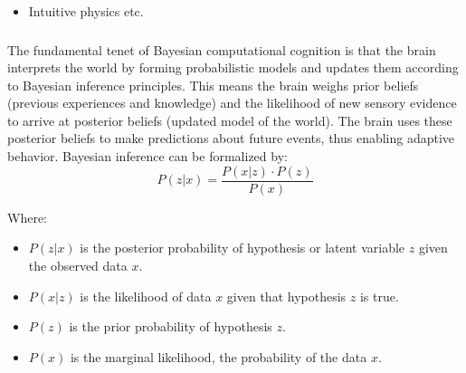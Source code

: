 
\begin{itemize}
    \item Intuitive physics etc.
\end{itemize}

\subsubsection{}

The fundamental tenet of Bayesian computational cognition is that the brain interprets the world by forming probabilistic models and updates them according to Bayesian inference principles. This means the brain weighs prior beliefs (previous experiences and knowledge) and the likelihood of new sensory evidence to arrive at posterior beliefs (updated model of the world). The brain uses these posterior beliefs to make predictions about future events, thus enabling adaptive behavior.
Bayesian inference can be formalized by:
\begin{equation}\label{form:bayes}
    P(z \vert x) = \frac{P(x \vert z) \cdot P(z)}{P(x)}    
\end{equation}

Where:

    

\begin{itemize}
    \item \( P(z \vert x) \) is the posterior probability of hypothesis or latent variable \( z \) given the observed data \( x \).
    \item \( P(x \vert z) \) is the likelihood of data \( x \) given that hypothesis \( z \) is true.
    \item \( P(z) \) is the prior probability of hypothesis \( z \).
    \item \( P(x) \) is the marginal likelihood, the probability of the data \( x \).
\end{itemize}


